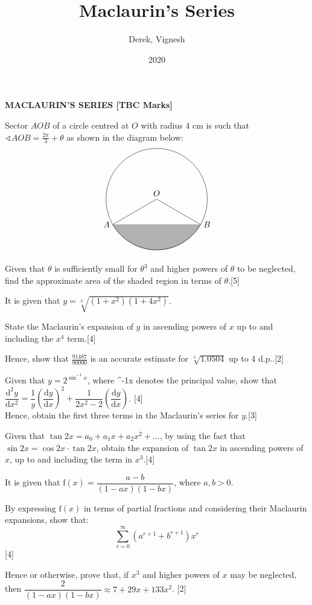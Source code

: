 \documentclass[12pt, a4 paper]{article}
\title{Maclaurin's Series}
\author{Derek, Vignesh}
\date{2020}
\begin{document}
\maketitle

\textbf{MACLAURIN'S SERIES [TBC Marks]}
\begin{outline}[enumerate]
\1 Sector $AOB$ of a circle centred at $O$ with radius 4 cm is such that $\sphericalangle AOB = \frac{2\pi}{3}+\theta$ as shown in the diagram below: %
\[
\begin{tikzpicture}
  \draw (0,0) node[above]{$O$} circle (60pt);
  \draw (-51.96152pt,-30pt) node[left]{$A$} -- (0,0);
  \draw (51.96152pt,-30pt) node[right]{$B$} -- (0,0);
  \filldraw[color=white!70!black,draw=black] (-51.96152pt,-30pt) arc (210:330:60pt);
  \draw[dotted](-51.96152pt,-30pt) -- (51.96152pt,-30pt);
\end{tikzpicture}
\]
Given that $\theta$ is sufficiently small for $\theta^3$ and higher powers of $\theta$ to be neglected, find the approximate area of the shaded region in terms of $\theta$.\hfill[5]

\1 It is given that $y=\sqrt[3]{(1+x^2)(1+4x^2)}$. %

  \2 State the Maclaurin's expansion of $y$ in ascending powers of $x$ up to and including the $x^4$ term.\hfill[4]

  \2 Hence, show that $\frac{91487}{90000}$ is an accurate estimate for $\sqrt[3]{1.0504}$  up to 4 d.p..\hfill[2]

\1 Given that $y=2^{\sin^{-1}{x}}$, where \sin^{-1}{x} denotes the principal value, show that $\dfrac{\mathrm{d}^2y}{\mathrm{d}x^2}=\dfrac{1}{y}\left(\dfrac{\mathrm{d}y}{\mathrm{d}x}\right)^2+\dfrac{1}{2x^2-2}\left(\dfrac{\mathrm{d}y}{\mathrm{d}x}\right)$. \hfill[4] \\
Hence, obtain the first three terms in the Maclaurin's series for $y$.\hfill[3] %

\1 Given that $\tan{2x}=a_{0}+a_{1}x+a_{2}x^2+...$, by using the fact that $\sin{2x}=\cos{2x}\cdot \tan{2x}$, obtain the expansion of $\tan{2x}$ in ascending powers of $x$, up to and including the term in $x^3$.\hfill[4] %

\1 It is given that $\textrm{f}(x)=\dfrac{a-b}{(1-ax)(1-bx)}$, where $a,b>0$. %

\2 By expressing $\textrm{f}(x)$ in terms of partial fractions and considering their Maclaurin expansions, show that: $$\sum_{r=0}^{\infty}(a^{r+1}+b^{r+1})x^{r}$$\hfill[4]

\2 Hence or otherwise, prove that, if $x^3$ and higher powers of $x$ may be neglected, then $\dfrac{2}{(1-ax)(1-bx)} \approx 7+29x+133x^2$.
\hfill[2]
\end{outline}
\end{document}

